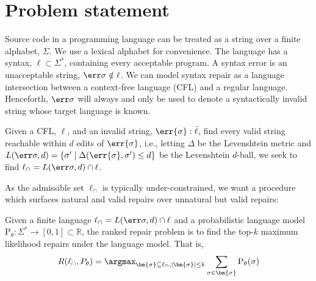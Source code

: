 \documentclass[runningheads]{llncs}
\begin{document}
  \section{Problem statement}\label{sec:problem}

  Source code in a programming language can be treated as a string over a finite alphabet, $\Sigma$. We use a lexical alphabet for convenience. The language has a syntax, $\ell \subset \Sigma^*$, containing every acceptable program. A syntax error is an unacceptable string, $\err\sigma \notin \ell$. We can model syntax repair as a language intersection between a context-free language (CFL) and a regular language. Henceforth, $\err\sigma$ will always and only be used to denote a syntactically invalid string whose target language is known.

  \begin{definition}\label{def:bcflr}
    Given a CFL, $\ell$, and an invalid string, $\err{\sigma}: \bar\ell$, find every valid string reachable within $d$ edits of $\err{\sigma}$, i.e., letting $\Delta$ be the Levenshtein metric and $L(\err\sigma, d) = \{\sigma' \mid \Delta(\err{\sigma}, \sigma') \leq d\}$ be the Levenshtein $d$-ball, we seek to find $\ell_\cap = L(\err\sigma, d) \cap \ell$.
  \end{definition}

%

  As the admissible set $\ell_\cap$ is typically under-constrained, we want a procedure which surfaces natural and valid repairs over unnatural but valid repairs:

  \begin{definition}\label{def:ranked-repair}
    Given a finite language $\ell_\cap = L(\err\sigma, d) \cap \ell$ and a probabilistic language model $\text{P}_\theta: \Sigma^* \rightarrow [0, 1] \subset \mathbb{R}$, the ranked repair problem is to find the top-$k$ maximum likelihood repairs under the language model. That is,
    \begin{equation}
      R(\ell_\cap, P_\theta) = \argmax_{\bm{\sigma} \subseteq \ell_\cap, |\bm{\sigma}| \leq k} \sum_{\sigma \in \bm{\sigma}}\text{P}_\theta(\sigma)
    \end{equation}
  \end{definition}
\end{document}
